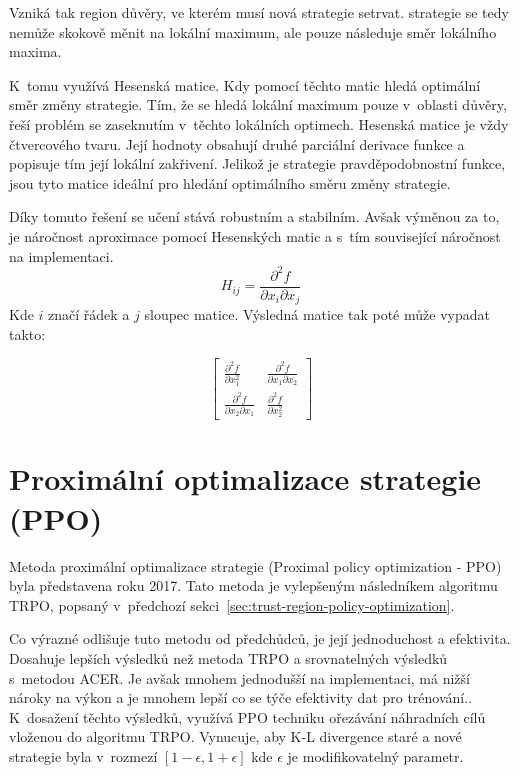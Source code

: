 Vzniká tak region důvěry, ve kterém musí nová strategie setrvat.
strategie se tedy nemůže skokově měnit na lokální maximum, ale pouze následuje směr lokálního maxima.

K~tomu využívá Hesenská matice.
Kdy pomocí těchto matic hledá optimální směr změny strategie.
Tím, že se hledá lokální maximum pouze v~oblasti důvěry, řeší problém se zaseknutím v~těchto lokálních optimech.
Hesenská matice je vždy čtvercového tvaru.
Její hodnoty obsahují druhé parciální derivace funkce a popisuje tím její lokální zakřivení.
Jelikož je strategie pravděpodobnostní funkce, jsou tyto matice ideální pro hledání optimálního směru změny strategie.

Díky tomuto řešení se učení stává robustním a stabilním.
Avšak výměnou za to, je náročnost aproximace pomocí Hesenských matic a s~tím související náročnost na implementaci.
\begin{equation}
  H_{ij} = \frac{\partial^2 f}{\partial x_i \partial x_j}
\end{equation}
Kde $i$ značí řádek a $j$ sloupec matice.
Výsledná matice tak poté může vypadat takto:

\begin{equation}
  \begin{bmatrix}
     \frac{\partial^2 f}{\partial x_1^2} & \frac{\partial^2 f}{\partial x_1 \partial x_2} \\
     \frac{\partial^2 f}{\partial x_2 \partial x_1} & \frac{\partial^2 f}{\partial x_2^2}
   \end{bmatrix}
\end{equation}

\section{Proximální optimalizace strategie (PPO)}
\label{sec:proximalni-optimalizace-strategie}


Metoda proximální optimalizace strategie (Proximal policy optimization - PPO) byla představena roku 2017\cite{PPO_paper}.
Tato metoda je vylepšeným následníkem algoritmu TRPO, popsaný v~předchozí sekci~\ref{sec:trust-region-policy-optimization}.

Co výrazné odlišuje tuto metodu od předchůdců, je její jednoduchost a efektivita.
Dosahuje lepších výsledků než metoda TRPO a srovnatelných výsledků s~metodou ACER\@.
Je avšak mnohem jednodušší na implementaci, má nižší nároky na výkon a je mnohem lepší co se týče efektivity dat pro trénování.\cite{PPO_paper}.
K~dosažení těchto výsledků, využívá PPO techniku ořezávání náhradních cílů vloženou do algoritmu TRPO\@.
Vynucuje, aby K-L divergence staré a nové strategie byla v~rozmezí $[1-\epsilon, 1+\epsilon]$ kde $\epsilon$ je modifikovatelný parametr.

